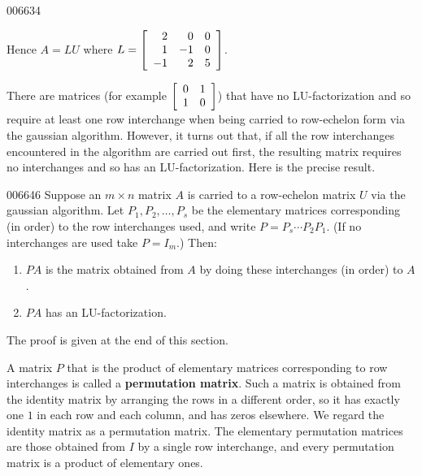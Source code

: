 \begin{example}{}{006634}
\begin{solution}
Hence $A = LU$ where $L = \left[ \begin{array}{rrr}
2 & 0 & 0 \\
1 & -1 & 0 \\
-1 & 2 & 5
\end{array} \right]$.
\end{solution}
\end{example}

There are matrices (for example $\left[ \begin{array}{rr}
0 & 1 \\
1 & 0
\end{array} \right]$) that have no LU-factorization and so require at least one row interchange when being carried to row-echelon form via the gaussian algorithm. However, it turns out that, if all the row interchanges encountered in the algorithm are carried out first, the resulting matrix requires no interchanges and so has an LU-factorization. Here is the precise result.

\begin{theorem}{}{006646}
Suppose an $m \times n$ matrix $A$ is carried to a row-echelon matrix $U$ via the gaussian algorithm. Let $P_{1}, P_{2}, \dots, P_{s}$ be the elementary matrices corresponding (in order) to the row interchanges used, and write $P = P_{s} \cdots P_{2}P_{1}$. (If no interchanges are used take $P = I_{m}$.) Then:

\begin{enumerate}
\item $PA$ is the matrix obtained from $A$ by doing these interchanges (in order) to $A$.

\item $PA$ has an LU-factorization.

\end{enumerate}
\end{theorem}

\noindent The proof is given at the end of this section.

A matrix $P$ that is the product of elementary matrices corresponding to row interchanges is called a \textbf{permutation matrix}. Such a matrix is obtained from the identity matrix by arranging the rows in a different order, so it has exactly one $1$ in each row and each column, and has zeros elsewhere. We regard the identity matrix as a permutation matrix. The elementary permutation matrices are those obtained from $I$ by a single row interchange, and every permutation matrix is a product of elementary ones.

